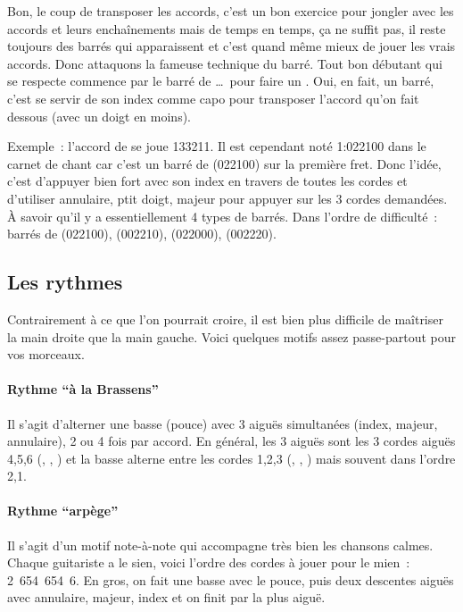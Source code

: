 \documentclass[online]{patacrep}
\begin{document}
Bon, le coup de transposer les accords, c'est un bon exercice pour
jongler avec les accords et leurs enchaînements mais de temps en
temps, ça ne suffit pas, il reste toujours des barrés qui apparaissent
et c'est quand même mieux de jouer les vrais accords. Donc attaquons
la fameuse technique du barré. Tout bon débutant qui se respecte
commence par le barré de  \dots\, pour faire un
. Oui, en fait, un barré, c'est se servir de son index comme
capo pour transposer l'accord qu'on fait dessous (avec un doigt en
moins).

Exemple~: l'accord de  se joue 133211. Il est cependant
noté 1:022100 dans le carnet de chant car c'est un barré de
 (022100) sur la première fret.  Donc l'idée, c'est
d'appuyer bien fort avec son index en travers de toutes les cordes et
d'utiliser annulaire, ptit doigt, majeur pour appuyer sur les 3 cordes
demandées. À savoir qu'il y a essentiellement 4 types de barrés.  Dans
l'ordre de difficulté~: barrés de  (022100), 
(002210),  (022000),  (002220).

\subsection{Les rythmes}

Contrairement à ce que l'on pourrait croire, il est bien plus
difficile de maîtriser la main droite que la main gauche.
Voici quelques motifs assez passe-partout pour vos morceaux.

\paragraph{Rythme ``à la Brassens''} 
Il s'agit d'alterner une basse (pouce) avec 3 aiguës simultanées
(index, majeur, annulaire), 2 ou 4 fois par accord. En général, les 3
aiguës sont les 3 cordes aiguës 4,5,6
(, , ) et la basse alterne entre
les cordes 1,2,3 (, , ) mais
souvent dans l'ordre 2,1.

\paragraph{Rythme ``arpège''} 
Il s'agit d'un motif note-à-note qui accompagne très bien les chansons
calmes. Chaque guitariste a le sien, voici l'ordre des cordes à jouer
pour le mien~: 2~654~654~6. En gros, on fait une basse avec le pouce,
puis deux descentes aiguës avec annulaire, majeur, index et on finit
par la plus aiguë.
\end{document}
